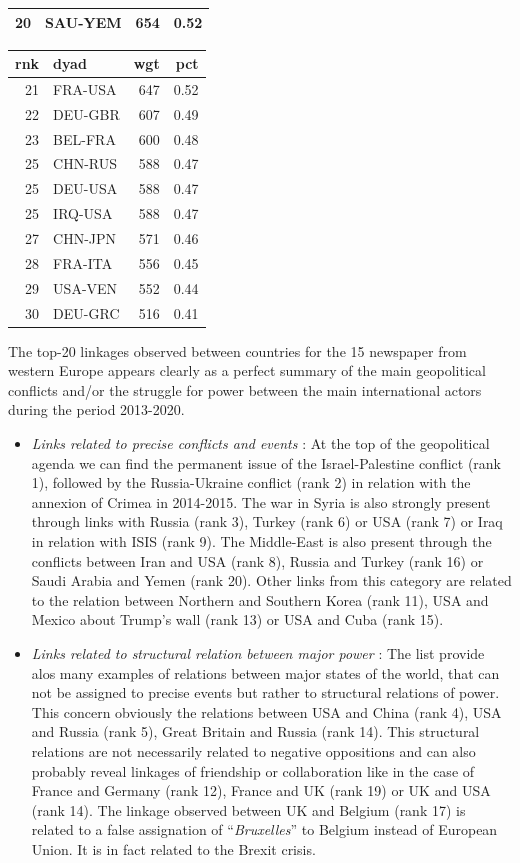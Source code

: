 \documentclass[
]{article}
\begin{document}
\begin{table}
\begin{tabular}[t]{r|l|r|r}
\hline
20 & SAU-YEM & 654 & 0.52\\
\hline
\end{tabular}
\begin{tabular}[t]{r|l|r|r}
\hline
rnk & dyad & wgt & pct\\
\hline
21 & FRA-USA & 647 & 0.52\\
\hline
22 & DEU-GBR & 607 & 0.49\\
\hline
23 & BEL-FRA & 600 & 0.48\\
\hline
25 & CHN-RUS & 588 & 0.47\\
\hline
25 & DEU-USA & 588 & 0.47\\
\hline
25 & IRQ-USA & 588 & 0.47\\
\hline
27 & CHN-JPN & 571 & 0.46\\
\hline
28 & FRA-ITA & 556 & 0.45\\
\hline
29 & USA-VEN & 552 & 0.44\\
\hline
30 & DEU-GRC & 516 & 0.41\\
\hline
\end{tabular}
\end{table}

The top-20 linkages observed between countries for the 15 newspaper from
western Europe appears clearly as a perfect summary of the main
geopolitical conflicts and/or the struggle for power between the main
international actors during the period 2013-2020.

\begin{itemize}
\item
  \emph{Links related to precise conflicts and events} : At the top of
  the geopolitical agenda we can find the permanent issue of the
  Israel-Palestine conflict (rank 1), followed by the Russia-Ukraine
  conflict (rank 2) in relation with the annexion of Crimea in
  2014-2015. The war in Syria is also strongly present through links
  with Russia (rank 3), Turkey (rank 6) or USA (rank 7) or Iraq in
  relation with ISIS (rank 9). The Middle-East is also present through
  the conflicts between Iran and USA (rank 8), Russia and Turkey (rank
  16) or Saudi Arabia and Yemen (rank 20). Other links from this
  category are related to the relation between Northern and Southern
  Korea (rank 11), USA and Mexico about Trump's wall (rank 13) or USA
  and Cuba (rank 15).
\item
  \emph{Links related to structural relation between major power} : The
  list provide alos many examples of relations between major states of
  the world, that can not be assigned to precise events but rather to
  structural relations of power. This concern obviously the relations
  between USA and China (rank 4), USA and Russia (rank 5), Great Britain
  and Russia (rank 14). This structural relations are not necessarily
  related to negative oppositions and can also probably reveal linkages
  of friendship or collaboration like in the case of France and Germany
  (rank 12), France and UK (rank 19) or UK and USA (rank 14). The
  linkage observed between UK and Belgium (rank 17) is related to a
  false assignation of ``\emph{Bruxelles}'' to Belgium instead of
  European Union. It is in fact related to the Brexit crisis.
\end{itemize}
\end{document}
